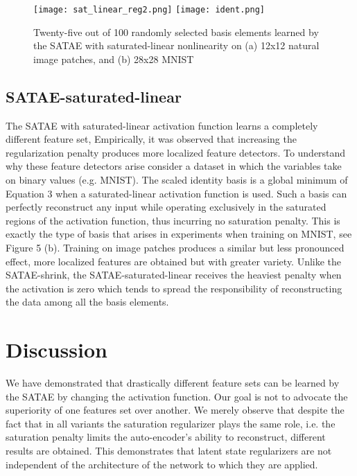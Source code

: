 \documentclass{article} %
\begin{document}
\begin{figure} \centering \texttt{[image: sat\_linear\_reg2.png]}
\texttt{[image: ident.png]} \caption{Twenty-five out of 100
randomly selected basis elements learned by the SATAE with saturated-linear
nonlinearity on (a) 12x12 natural image patches, and (b) 28x28 MNIST }
\end{figure} 

\subsection{SATAE-saturated-linear} The SATAE with saturated-linear activation
function learns a completely different feature set, Empirically, it was
observed that increasing the regularization penalty produces more localized
feature detectors. To understand why these feature detectors arise consider a
dataset in which the variables take on binary values (e.g. MNIST). The scaled
identity basis is a global minimum of Equation 3 when a saturated-linear
activation function is used. Such a basis can perfectly reconstruct any input
while operating exclusively in the saturated regions of the activation
function, thus incurring no saturation penalty. This is exactly the type of
basis that arises in experiments when training on MNIST, see Figure 5 (b).
Training on image patches produces a similar but less pronounced effect, more
localized features are obtained but with greater variety. Unlike the
SATAE-shrink, the SATAE-saturated-linear receives the heaviest penalty when the
activation is zero which tends to spread the responsibility of reconstructing
the data among all the basis elements.   

\section{Discussion} We have demonstrated that drastically different feature
sets can be learned by the SATAE by changing the activation function. Our goal
is not to advocate the superiority of one features set over another. We merely
observe that despite the fact that in all variants the saturation regularizer
plays the same role, i.e. the saturation penalty limits the auto-encoder's
ability to reconstruct, different results are obtained. This demonstrates that
latent state regularizers are not independent of the architecture of the
network to which they are applied.   
\end{document}

